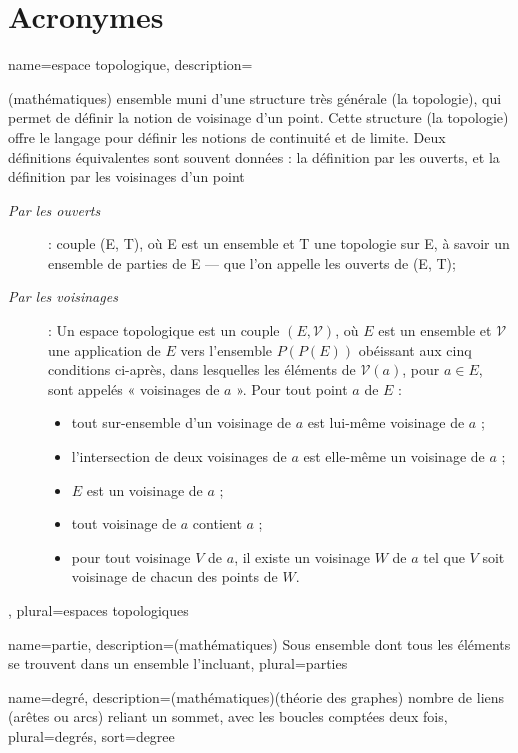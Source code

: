 \chapter*{Acronymes}                      %

{
	name={espace topologique},
	description={(mathématiques) ensemble muni d'une structure très générale (la topologie), qui permet de définir la notion de voisinage d'un point. Cette structure (la topologie) offre le langage pour définir les notions de continuité et de limite. Deux définitions équivalentes sont souvent données : la définition par les ouverts, et la définition par les voisinages d'un point
	\begin{description}
		\item [\emph{Par les ouverts}] : couple (E, T), où E est un ensemble et T une topologie sur E, à savoir un ensemble de parties de E — que l'on appelle les ouverts de (E, T);
		\item [\emph{Par les voisinages}] : Un espace topologique est un couple $(E,\mathcal {V})$, où $E$ est un ensemble et $\mathcal {V}$ une application de $E$ vers l'ensemble $P(P(E))$ obéissant aux cinq conditions ci-après, dans lesquelles les éléments de $\mathcal {V}(a)$, pour $a \in E$, sont appelés « voisinages de $a$ ». Pour tout point $a$ de $E$ :
		\begin{itemize}
			\item tout sur-ensemble d'un voisinage de $a$ est lui-même voisinage de $a$ ;
			\item l'intersection de deux voisinages de $a$ est elle-même un voisinage de $a$ ;
			\item $E$ est un voisinage de $a$ ;
			\item tout voisinage de $a$ contient $a$ ;
			\item pour tout voisinage $V$ de $a$, il existe un voisinage $W$ de $a$ tel que $V$ soit voisinage de chacun des points de $W$.
		\end{itemize}
	\end{description}},
	plural={espaces topologiques}
}

{
	name={partie},
	description={(mathématiques) Sous ensemble dont tous les éléments se trouvent dans un ensemble l'incluant}, 
	plural={parties}
}

{
	name={degr\'e},
	description={(mathématiques)(théorie des graphes) nombre de liens (arêtes ou arcs) reliant un sommet, avec les boucles comptées deux fois}, 
	plural={degr\'es},
	sort={degree}
}

